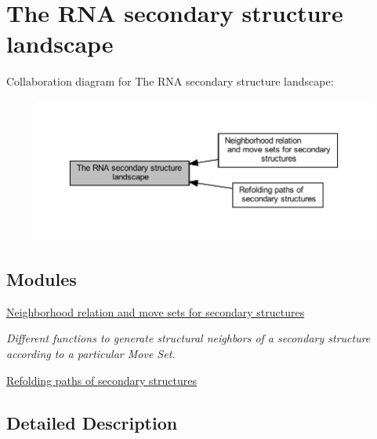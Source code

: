 \hypertarget{group__landscape}{}\section{The R\+NA secondary structure landscape}
\label{group__landscape}
Collaboration diagram for The R\+NA secondary structure landscape\+:
\nopagebreak
\begin{figure}[H]
\begin{center}
\leavevmode
\includegraphics[width=350pt]{group__landscape}
\end{center}
\end{figure}
\subsection*{Modules}
\begin{DoxyCompactItemize}
\item 
\hyperlink{group__neighbors}{Neighborhood relation and move sets for secondary structures}
\begin{DoxyCompactList}\small\item\em Different functions to generate structural neighbors of a secondary structure according to a particular Move Set. \end{DoxyCompactList}\item 
\hyperlink{group__paths}{Refolding paths of secondary structures}
\end{DoxyCompactItemize}


\subsection{Detailed Description}
